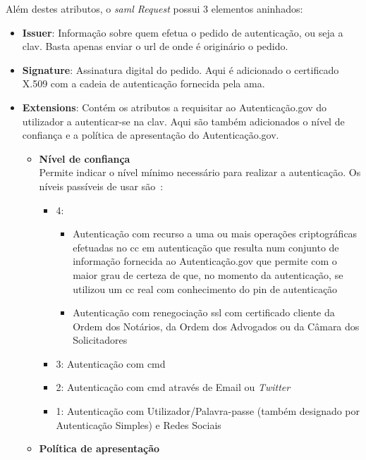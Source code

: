 Além destes atributos, o \textit{\acrshort{saml} Request} possui 3 elementos aninhados:\label{sec:soaAuthCMDReq}
\begin{itemize}
    \item \textbf{Issuer}: Informação sobre quem efetua o pedido de autenticação, ou seja a \acrshort{clav}. Basta apenas enviar o \acrshort{url} de onde é originário o pedido.
    \item \textbf{Signature}: Assinatura digital do pedido. Aqui é adicionado o certificado X.509 com a cadeia de autenticação fornecida pela \acrshort{ama}.
    \item \textbf{Extensions}: Contém os atributos a requisitar ao Autenticação.gov do utilizador a autenticar-se na \acrshort{clav}. Aqui são também adicionados o nível de confiança e a política de apresentação do Autenticação.gov.
    \begin{itemize}
        \item \textbf{Nível de confiança} \\
        Permite indicar o nível mínimo necessário para realizar a autenticação. Os níveis passíveis de usar são~\cite{agov2}:
        \begin{itemize}
            \item 4:
            \begin{itemize}
                \item Autenticação com recurso a uma ou mais operações criptográficas efetuadas no \acrlong{cc} em autenticação que resulta num conjunto de informação fornecida ao Autenticação.gov que permite com o maior grau de certeza de que, no momento da autenticação, se utilizou um \acrlong{cc} real com conhecimento do \acrshort{pin} de autenticação
                \item Autenticação com renegociação \acrshort{ssl} com certificado cliente da Ordem dos Notários, da Ordem dos Advogados ou da Câmara dos Solicitadores
            \end{itemize}
            \item 3: Autenticação com \acrlong{cmd}
            \item 2: Autenticação com \acrlong{cmd} através de Email ou \textit{Twitter}
            \item 1: Autenticação com Utilizador/Palavra-passe (também designado por Autenticação Simples) e Redes Sociais
        \end{itemize}
        \item \textbf{Política de apresentação} \\

\end{itemize}
\end{itemize}
